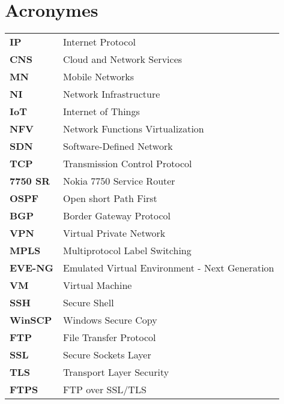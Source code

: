 \chapter{Acronymes}


\begin{tabular}{l l}


\textbf{IP} & Internet Protocol \\
\textbf{CNS} & Cloud and Network Services \\
\textbf{MN} & Mobile Networks \\
\textbf{NI} & Network Infrastructure \\
\textbf{IoT} & Internet of Things \\
\textbf{NFV} & Network Functions Virtualization \\
\textbf{SDN} & Software-Defined Network \\
\textbf{TCP} & Transmission Control Protocol \\
\textbf{7750 SR} & Nokia 7750 Service Router \\
\textbf{OSPF} & Open short Path First \\
\textbf{BGP} & Border Gateway Protocol \\
\textbf{VPN} & Virtual Private Network \\
\textbf{MPLS} & Multiprotocol Label Switching \\
\textbf{EVE-NG} & Emulated Virtual Environment - Next Generation \\
\textbf{VM} & Virtual Machine \\
\textbf{SSH} & Secure Shell \\
\textbf{WinSCP} & Windows Secure Copy \\
\textbf{FTP} & File Transfer Protocol \\
\textbf{SSL} & Secure Sockets Layer \\
\textbf{TLS} & Transport Layer Security \\
\textbf{FTPS} & FTP over SSL/TLS \\



\end{tabular}

\pagebreak

